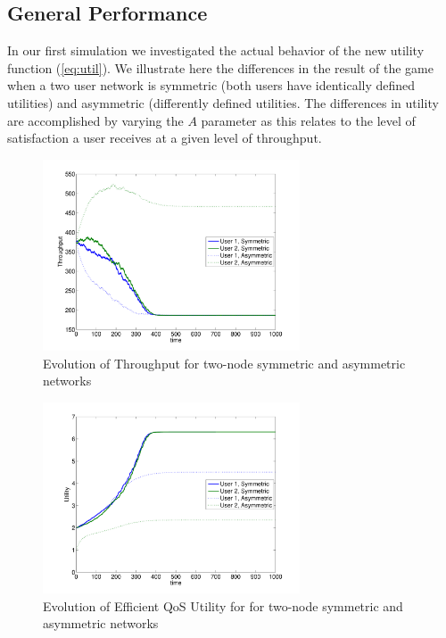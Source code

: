 \documentclass[conference]{IEEEtran}
\theoremstyle{definition}
\begin{document}
\subsection{General Performance}
In our first simulation we investigated the actual behavior of the new utility function (\ref{eq:util}). We illustrate here the differences in the result of the game when a two user network is symmetric (both users have identically defined utilities) and asymmetric (differently defined utilities. The differences in utility are accomplished by varying the $A$ parameter as this relates to the level of satisfaction a user receives at a given level of throughput.
\begin{figure}[htp]
\begin{center}
\includegraphics[width=3in]{sim1a.pdf}
\caption{Evolution of Throughput for two-node symmetric and asymmetric networks}
\label{fig:sim1a}
\end{center}
%
\end{figure}
\begin{figure}[htp]
\begin{center}
\includegraphics[width=3in]{sim1b.pdf}
\caption{Evolution of Efficient QoS Utility for for two-node symmetric and asymmetric networks}
\label{fig:sim1b}
\end{center}
\end{figure}
%
\end{document}
